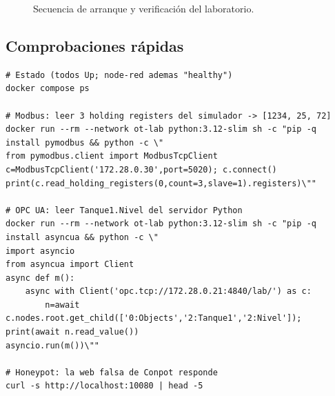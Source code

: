 \begin{figure}[H]
\centering
{}
\caption{Secuencia de arranque y verificación del laboratorio.}
\label{fig:arranque}
\end{figure}

\subsection{Comprobaciones rápidas}

\begin{lstlisting}[style=bash]
# Estado (todos Up; node-red ademas "healthy")
docker compose ps

# Modbus: leer 3 holding registers del simulador -> [1234, 25, 72]
docker run --rm --network ot-lab python:3.12-slim sh -c "pip -q install pymodbus && python -c \"
from pymodbus.client import ModbusTcpClient
c=ModbusTcpClient('172.28.0.30',port=5020); c.connect()
print(c.read_holding_registers(0,count=3,slave=1).registers)\""

# OPC UA: leer Tanque1.Nivel del servidor Python
docker run --rm --network ot-lab python:3.12-slim sh -c "pip -q install asyncua && python -c \"
import asyncio
from asyncua import Client
async def m():
    async with Client('opc.tcp://172.28.0.21:4840/lab/') as c:
        n=await c.nodes.root.get_child(['0:Objects','2:Tanque1','2:Nivel']); print(await n.read_value())
asyncio.run(m())\""

# Honeypot: la web falsa de Conpot responde
curl -s http://localhost:10080 | head -5
\end{lstlisting}


